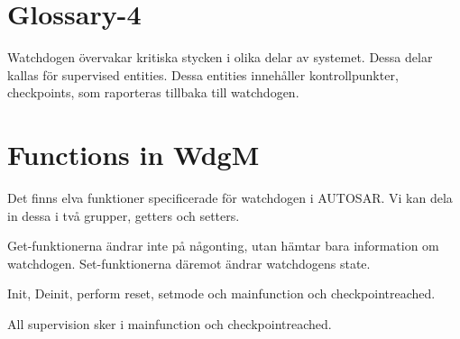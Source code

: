 \documentclass[a4paper]{article}
\begin{document}
\section{Glossary-4}
Watchdogen övervakar kritiska stycken i olika delar av systemet. Dessa
delar kallas för supervised entities. Dessa entities innehåller
kontrollpunkter, checkpoints, som raporteras tillbaka till watchdogen.



\section{Functions in WdgM}
Det finns elva funktioner specificerade för watchdogen i AUTOSAR.
Vi kan dela in dessa i två grupper, getters och setters.


Get-funktionerna ändrar inte på någonting, utan hämtar bara
information om watchdogen.
Set-funktionerna däremot ändrar watchdogens state.

Init, Deinit, perform reset, setmode och
mainfunction och checkpointreached.

All supervision sker i mainfunction och checkpointreached.






\end{document}
